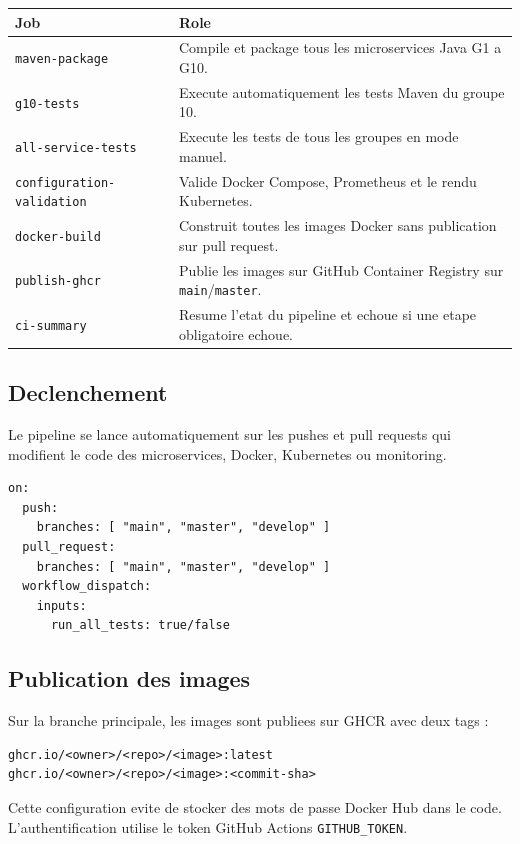 \documentclass[12pt,a4paper]{article}
\begin{document}
\begin{longtable}{p{4cm}p{10cm}}
\toprule
\textbf{Job} & \textbf{Role} \\
\midrule
\texttt{maven-package} & Compile et package tous les microservices Java G1 a G10. \\
\texttt{g10-tests} & Execute automatiquement les tests Maven du groupe 10. \\
\texttt{all-service-tests} & Execute les tests de tous les groupes en mode manuel. \\
\texttt{configuration-validation} & Valide Docker Compose, Prometheus et le rendu Kubernetes. \\
\texttt{docker-build} & Construit toutes les images Docker sans publication sur pull request. \\
\texttt{publish-ghcr} & Publie les images sur GitHub Container Registry sur \texttt{main}/\texttt{master}. \\
\texttt{ci-summary} & Resume l'etat du pipeline et echoue si une etape obligatoire echoue. \\
\bottomrule
\end{longtable}

\subsection{Declenchement}

Le pipeline se lance automatiquement sur les pushes et pull requests qui modifient le code des microservices, Docker, Kubernetes ou monitoring.

\begin{lstlisting}[style=code]
on:
  push:
    branches: [ "main", "master", "develop" ]
  pull_request:
    branches: [ "main", "master", "develop" ]
  workflow_dispatch:
    inputs:
      run_all_tests: true/false
\end{lstlisting}

\subsection{Publication des images}

Sur la branche principale, les images sont publiees sur GHCR avec deux tags :

\begin{lstlisting}[style=code]
ghcr.io/<owner>/<repo>/<image>:latest
ghcr.io/<owner>/<repo>/<image>:<commit-sha>
\end{lstlisting}

Cette configuration evite de stocker des mots de passe Docker Hub dans le code. L'authentification utilise le token GitHub Actions \texttt{GITHUB\_TOKEN}.
\end{document}
